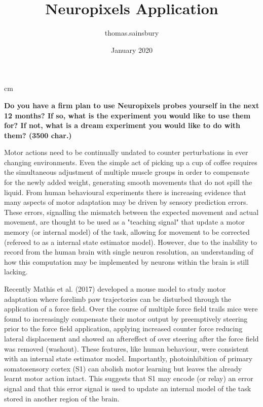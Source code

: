 \documentclass{article}
\title{Neuropixels Application}
\author{thomas.sainsbury }
\date{January 2020}
\begin{document}
\setlength\parindent{0pt}
 cm 
\maketitle

\textbf{Do you have a firm plan to use Neuropixels probes yourself in the next 12 months? If so, what is the experiment you would like to use them for? If not, what is a dream experiment you would like to do with them? (3500 char.) }

Motor actions need to be continually undated to counter perturbations in ever changing environments. Even the simple act of picking up a cup of coffee requires the simultaneous adjustment of multiple muscle groups in order to compensate for the newly added weight, generating smooth movements that do not spill the liquid. From human behavioural experiments there is increasing evidence that many aspects of motor adaptation may be driven by sensory prediction errors. These errors, signalling the mismatch between the expected movement and actual movement, are thought to be used as a "teaching signal" that update a motor memory (or internal model) of the task, allowing for movement to be corrected (refereed to as a internal state estimator model). However, due to the inability to record from the human brain with single neuron resolution, an understanding of how this computation may be implemented by neurons within the brain is still lacking.

Recently Mathis et al. (2017) developed a mouse model to study motor adaptation where forelimb paw trajectories can be disturbed through the application of a force field. Over the course of multiple force field trails mice were found to increasingly compensate their motor output by preemptively steering prior to the force field application, applying increased counter force reducing lateral displacement and showed an aftereffect of over steering after the force field was removed (washout). These features, like human behaviour, were consistent with an internal state estimator model. Importantly, photoinhibition of primary somatosensory cortex (S1) can abolish motor learning but leaves the already learnt motor action intact. This suggests that S1 may encode (or relay) an error signal and that this error signal is used to update an internal model of the task stored in another region of the brain.
\end{document}

